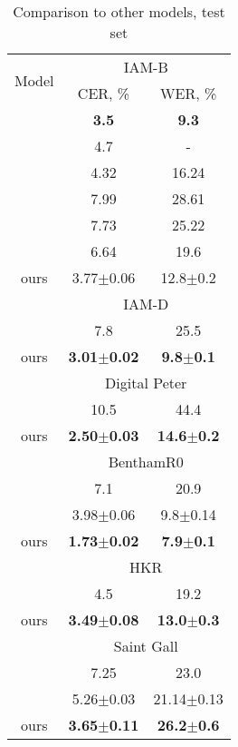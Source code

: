 \documentclass[10pt,twocolumn,letterpaper]{article}
\begin{document}
\begin{table}[ht]
\begin{center}
\begin{tabular}{|c|c|c|}
\hline
\multirow{2}{*}{Model} & \multicolumn{2}{c|}{IAM-B}\\
\cline{2-3}
& CER, \% & WER, \% \\
\hline
\cite{voigtlaender2016handwriting} & \textbf{3.5} & \textbf{9.3} \\
\cite{yousef2020origaminet} & 4.7 & - \\
\cite{coquenet2020end} & 4.32 & 16.24 \\
\cite{coquenet2020recurrence} & 7.99 & 28.61\\
\cite{moysset20192d} & 7.73 & 25.22\\
\cite{wang2020decoupled} & 6.64 & 19.6\\
ours & 3.77$\pm$0.06  & 12.8$\pm$0.2\\
\hline
\hline
\multirow{2}{*}{} & \multicolumn{2}{c|}{IAM-D}\\
\cline{2-3}
\cite{abdallah2020attention}&7.8 & 25.5\\
ours & \textbf{3.01$\pm$0.02}  & \textbf{9.8$\pm$0.1}\\
\hline
\hline
\multirow{2}{*}{}& \multicolumn{2}{c|}{Digital Peter}\\
\cline{2-3}
\cite{complink}&10.5 & 44.4\\
ours & \textbf{2.50$\pm$0.03}  & \textbf{14.6$\pm$0.2}\\
\hline
\hline
\multirow{2}{*}{} & \multicolumn{2}{c|}{BenthamR0}\\
\cline{2-3}
\cite{abdallah2020attention} & 7.1 & 20.9 \\
\cite{de2020htr}& 3.98$\pm$0.06  & 9.8$\pm$0.14\\
ours & \textbf{1.73$\pm$0.02}  & \textbf{7.9$\pm$0.1}\\
\hline
\hline
\multirow{2}{*}{} & \multicolumn{2}{c|}{HKR}\\
\cline{2-3}
\cite{abdallah2020attention} & 4.5 & 19.2\\
ours & \textbf{3.49$\pm$0.08}  & \textbf{13.0$\pm$0.3}\\
\hline
\hline
\multirow{2}{*}{}& \multicolumn{2}{c|}{Saint Gall}\\
\cline{2-3}
\cite{abdallah2020attention} & 7.25 & 23.0\\
\cite{de2020htr}  & 5.26$\pm$0.03 & 21.14$\pm$0.13 \\
ours & \textbf{3.65$\pm$0.11}  & \textbf{26.2$\pm$0.6} \\
\hline
\end{tabular}
\end{center}
\caption{\label{tab:hwb-result-comparison} Comparison to other models, test set}
\end{table}
\end{document}
